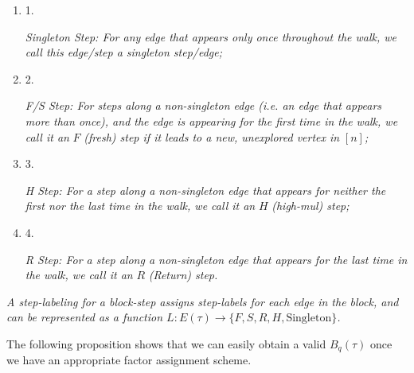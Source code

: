 \begin{enumerate}


\item[] 
1. 


\emph{Singleton Step}\emph{: For any edge that appears only once throughout the walk, we call this edge/step a singleton step/edge;}\par





\item[] 
2. 


\emph{F/S Step}\emph{: For steps along a non-singleton edge (i.e. an edge that appears more than once), and the edge is appearing for the first time in the walk, we call it an }$F$\emph{ (fresh) step if it leads to a new, unexplored vertex in }$[n]$\emph{;}\par





\item[] 
3. 


\emph{H Step}\emph{: For a step along a non-singleton edge that appears for neither the first nor the last time in the walk, we call it an }$H$\emph{ (high-mul) step;}\par





\item[] 
4. 


\emph{R Step}\emph{: For a step along a non-singleton edge that appears for the last time in the walk, we call it an }$R$\emph{ (Return) step.}\par





\end{enumerate}


\emph{A step-labeling for a block-step assigns step-labels for each edge in the block, and can be represented as a function $L:E(\tau)\rightarrow\{F,S,R,H,\text{Singleton}\}$.}\par






The following proposition shows that we can easily obtain a valid $B_{q}(\tau)$ once we have an appropriate factor assignment scheme.\par



